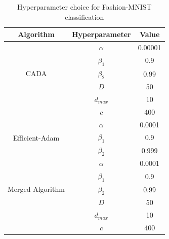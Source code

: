 \begin{table}[htbp]
  \caption{\label{hyperparamfashion}Hyperparameter choice for Fashion-MNIST classification}
  \centering
  \begin{tabular}{ | c | c | c | }
    \hline
    \textbf{Algorithm}                                       & \textbf{Hyperparameter} & \textbf{Value} \\
    \hline
    \multirow{5}{*}{CADA \cite{Chen2021CADA}}                & $\alpha$                & 0.00001        \\
                                                             & $\beta_1$               & 0.9            \\
                                                             & $\beta_2$               & 0.99           \\
                                                             & $D$                     & 50             \\
                                                             & $d_{max}$               & 10             \\
                                                             & $c$                     & 400            \\
    \hline
    \multirow{3}{*}{Efficient-Adam \cite{Chen2022Efficient}} & $\alpha$                & 0.0001         \\
                                                             & $\beta_1$               & 0.9            \\
                                                             & $\beta_2$               & 0.999          \\
    \hline
    \multirow{5}{*}{Merged Algorithm}                        & $\alpha$                & 0.0001         \\
                                                             & $\beta_1$               & 0.9            \\
                                                             & $\beta_2$               & 0.99           \\
                                                             & $D$                     & 50             \\
                                                             & $d_{max}$               & 10             \\
                                                             & $c$                     & 400            \\
    \hline
  \end{tabular}
\end{table}

